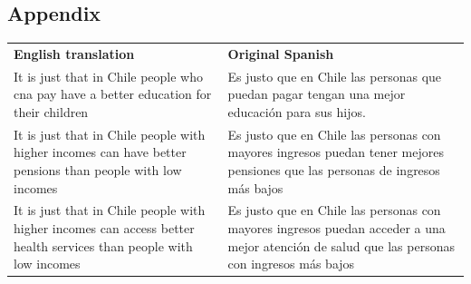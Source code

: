 \documentclass[
  letterpaper,
  DIV=11,
  numbers=noendperiod]{scrartcl}
\begin{document}
\hypertarget{appendix}{%
\subsection{Appendix}\label{appendix}}

\begin{longtable}[]{@{}
  >{\raggedright\arraybackslash}p{}
  >{\raggedright\arraybackslash}p{}@{}}
\toprule()
\endhead
\textbf{English translation} & \textbf{Original Spanish} \\
It is just that in Chile people who cna pay have a better education for
their children & Es justo que en Chile las personas que puedan pagar
tengan una mejor educación para sus hijos. \\
It is just that in Chile people with higher incomes can have better
pensions than people with low incomes & Es justo que en Chile las
personas con mayores ingresos puedan tener mejores pensiones que las
personas de ingresos más bajos \\
It is just that in Chile people with higher incomes can access better
health services than people with low incomes & Es justo que en Chile las
personas con mayores ingresos puedan acceder a una mejor atención de
salud que las personas con ingresos más bajos \\
\bottomrule()
\end{longtable}
\end{document}

